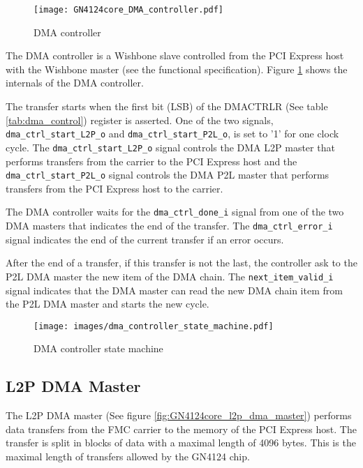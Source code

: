 \documentclass[10pt,a4paper]{cerndoc}
\begin{document}
\begin{figure}[!ht]
  \centering
  \texttt{[image: GN4124core\_DMA\_controller.pdf]}
  \caption{DMA controller}
  \label{fig:GN4124core_dma_ctrl}
\end{figure}
  
The DMA controller is a Wishbone slave controlled from the PCI Express host with the Wishbone master (see the functional specification). Figure \ref{fig:GN4124core_dma_ctrl} shows the internals of the DMA controller.

The transfer starts when the first bit (LSB) of the DMACTRLR (See table  \ref{tab:dma_control}) register is asserted. One of the two signals, \verb+dma_ctrl_start_L2P_o+ and \verb+dma_ctrl_start_P2L_o+, is set to '1' for one clock cycle. The \verb+dma_ctrl_start_L2P_o+ signal controls the DMA L2P master that performs transfers from the carrier to the PCI Express host and the \verb+dma_ctrl_start_P2L_o+ signal controls the DMA P2L master that performs transfers from the PCI Express host to the carrier.

The DMA controller waits for the \verb+dma_ctrl_done_i+ signal from one of the two DMA masters that indicates the end of the transfer. The \verb+dma_ctrl_error_i+ signal indicates the end of the current transfer if an error occurs.

After the end of a transfer, if this transfer is not the last, the controller ask to the P2L DMA master the new item of the DMA chain. The \verb+next_item_valid_i+ signal indicates that the DMA master can read the new DMA chain item from the P2L DMA master and starts the new cycle.




\begin{figure}[!ht]
  \centering
  \texttt{[image: images/dma\_controller\_state\_machine.pdf]}
  \caption{DMA controller state machine}
  \label{fig:GN4124core_dma_ctrl_state_machine}
\end{figure}



  \subsection{L2P DMA Master}
The L2P DMA master (See figure \ref{fig:GN4124core_l2p_dma_master}) performs data transfers from the FMC carrier to the memory of the PCI Express host. The transfer is split in blocks of data with a maximal length of 4096 bytes. This is the maximal length of transfers allowed by the GN4124 chip.
\end{document}
